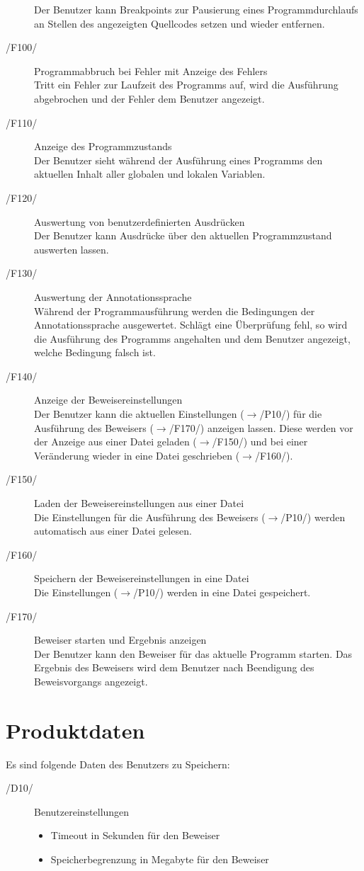 \documentclass[a4paper,10pt]{article}
\begin{document}
\begin{description}
Der Benutzer kann Breakpoints zur Pausierung eines Programmdurchlaufs an Stellen des angezeigten Quellcodes setzen und wieder entfernen.
\item[/F100/] Programmabbruch bei Fehler mit Anzeige des Fehlers\\
Tritt ein Fehler zur Laufzeit des Programms auf, wird die Ausführung abgebrochen und der Fehler dem Benutzer angezeigt.
\item[/F110/] Anzeige des Programmzustands\\
Der Benutzer sieht während der Ausführung eines Programms den aktuellen Inhalt aller globalen und lokalen Variablen.
\item[/F120/] Auswertung von benutzerdefinierten Ausdrücken\\
Der Benutzer kann Ausdrücke über den aktuellen Programmzustand auswerten lassen.
\item[/F130/] Auswertung der Annotationssprache\\
Während der Programmausführung werden die Bedingungen der Annotationssprache ausgewertet. Schlägt eine Überprüfung fehl, so wird die Ausführung des Programms angehalten und dem Benutzer angezeigt, welche Bedingung falsch ist.
\item[/F140/] Anzeige der Beweisereinstellungen\\
Der Benutzer kann die aktuellen Einstellungen ($\to$/P10/) für die Ausführung des Beweisers ($\to$/F170/) anzeigen lassen. Diese werden vor der Anzeige aus einer Datei geladen ($\to$/F150/) und bei einer Veränderung wieder in eine Datei geschrieben ($\to$/F160/).
\item[/F150/] Laden der Beweisereinstellungen aus einer Datei\\
Die Einstellungen für die Ausführung des Beweisers ($\to$/P10/) werden automatisch aus einer Datei gelesen.
\item[/F160/] Speichern der Beweisereinstellungen in eine Datei\\
Die Einstellungen ($\to$/P10/) werden in eine Datei gespeichert.
\item[/F170/] Beweiser starten und Ergebnis anzeigen\\
Der Benutzer kann den Beweiser für das aktuelle Programm starten. Das Ergebnis des Beweisers wird dem Benutzer nach Beendigung des Beweisvorgangs angezeigt.
\end{description}

\section{Produktdaten}
Es sind folgende Daten des Benutzers zu Speichern:
\begin{description}
\item[/D10/] Benutzereinstellungen
\begin{itemize}
  \item Timeout in Sekunden für den Beweiser
  \item Speicherbegrenzung in Megabyte für den Beweiser
\end{itemize}
\end{description}
\end{document}
